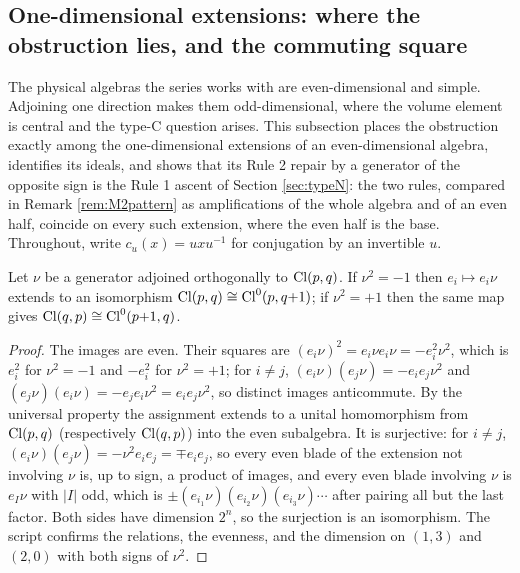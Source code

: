 \subsection{One-dimensional extensions: where the obstruction lies, and the commuting square}\label{subsec:extension}

The physical algebras the series works with are even-dimensional and simple. Adjoining one direction makes them odd-dimensional, where the volume element is central and the type-C question arises. This subsection places the obstruction exactly among the one-dimensional extensions of an even-dimensional algebra, identifies its ideals, and shows that its Rule 2 repair by a generator of the opposite sign is the Rule 1 ascent of Section \ref{sec:typeN}: the two rules, compared in Remark \ref{rem:M2pattern} as amplifications of the whole algebra and of an even half, coincide on every such extension, where the even half is the base. Throughout, write $c_u(x) = u x u^{-1}$ for conjugation by an invertible $u$.

\begin{lemma}\label{lem:even}
Let $\nu$ be a generator adjoined orthogonally to $\mathrm{Cl}(p,q)$. If $\nu^2 = -1$ then $e_i \mapsto e_i\nu$ extends to an isomorphism $\mathrm{Cl}(p,q) \cong \mathrm{Cl}^0(p,q{+}1)$; if $\nu^2 = +1$ then the same map gives $\mathrm{Cl}(q,p) \cong \mathrm{Cl}^0(p{+}1,q)$.
\end{lemma}

\begin{proof}
The images are even. Their squares are $(e_i\nu)^2 = e_i\nu e_i\nu = -e_i^2\nu^2$, which is $e_i^2$ for $\nu^2 = -1$ and $-e_i^2$ for $\nu^2 = +1$; for $i \neq j$, $(e_i\nu)(e_j\nu) = -e_ie_j\nu^2$ and $(e_j\nu)(e_i\nu) = -e_je_i\nu^2 = e_ie_j\nu^2$, so distinct images anticommute. By the universal property the assignment extends to a unital homomorphism from $\mathrm{Cl}(p,q)$ (respectively $\mathrm{Cl}(q,p)$) into the even subalgebra. It is surjective: for $i \neq j$, $(e_i\nu)(e_j\nu) = -\nu^2 e_ie_j = \mp e_ie_j$, so every even blade of the extension not involving $\nu$ is, up to sign, a product of images, and every even blade involving $\nu$ is $e_I\nu$ with $|I|$ odd, which is $\pm(e_{i_1}\nu)(e_{i_2}\nu)(e_{i_3}\nu)\cdots$ after pairing all but the last factor. Both sides have dimension $2^n$, so the surjection is an isomorphism. The script confirms the relations, the evenness, and the dimension on $(1,3)$ and $(2,0)$ with both signs of $\nu^2$.
\end{proof}

